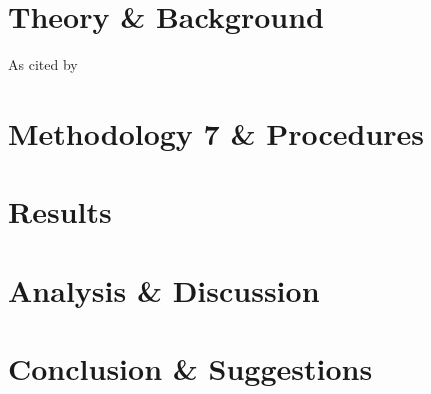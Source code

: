 \documentclass{article}
\begin{document}
\section{Theory \& Background}
As cited by \cite{10.5555/519085}
\section{Methodology 7 \& Procedures}
\section{Results}
\section{Analysis \& Discussion}
\section{Conclusion \& Suggestions}

\newpage


\renewcommand{\bibname}{References}

\end{document}
